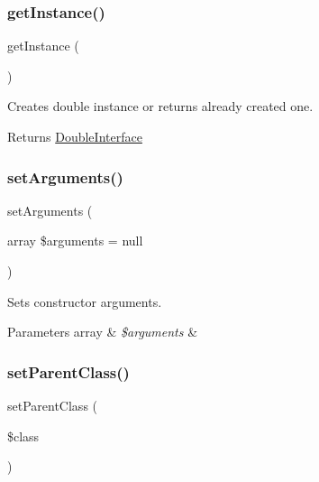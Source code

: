 \subsubsection{\texorpdfstring{get\+Instance()}{getInstance()}}
{\footnotesize\ttfamily get\+Instance (\begin{DoxyParamCaption}{ }\end{DoxyParamCaption})}

Creates double instance or returns already created one.

\begin{DoxyReturn}{Returns}
\mbox{\hyperlink{interface_prophecy_1_1_doubler_1_1_double_interface}{Double\+Interface}} 
\end{DoxyReturn}
\mbox{\label{class_prophecy_1_1_doubler_1_1_lazy_double_a5398ebf107a0f0c136b0d134714b13ff}} 
\subsubsection{\texorpdfstring{set\+Arguments()}{setArguments()}}
{\footnotesize\ttfamily set\+Arguments (\begin{DoxyParamCaption}\item[{array}]{\$arguments = {\ttfamily null} }\end{DoxyParamCaption})}

Sets constructor arguments.


\begin{DoxyParams}[1]{Parameters}
array & {\em \$arguments} & \\
\hline
\end{DoxyParams}
\mbox{\label{class_prophecy_1_1_doubler_1_1_lazy_double_a36c45e1400b3e0404a90bfa058ef8019}} 
\subsubsection{\texorpdfstring{set\+Parent\+Class()}{setParentClass()}}
{\footnotesize\ttfamily set\+Parent\+Class (\begin{DoxyParamCaption}\item[{}]{\$class }\end{DoxyParamCaption})}

